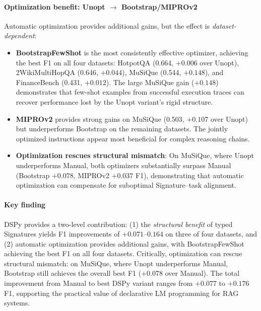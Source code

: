 \paragraph{Optimization benefit: Unopt $\to$ Bootstrap/MIPROv2}
Automatic optimization provides additional gains, but the effect is \emph{dataset-dependent}:

\begin{itemize}
    \item \textbf{BootstrapFewShot} is the most consistently effective optimizer, achieving the best F1 on all four datasets: HotpotQA (0.664, $+0.006$ over Unopt), 2WikiMultiHopQA (0.646, $+0.044$), MuSiQue (0.544, $+0.148$), and FinanceBench (0.431, $+0.012$). The large MuSiQue gain ($+0.148$) demonstrates that few-shot examples from successful execution traces can recover performance lost by the Unopt variant's rigid structure.

    \item \textbf{MIPROv2} provides strong gains on MuSiQue (0.503, $+0.107$ over Unopt) but underperforms Bootstrap on the remaining datasets. The jointly optimized instructions appear most beneficial for complex reasoning chains.

    \item \textbf{Optimization rescues structural mismatch}: On MuSiQue, where Unopt underperforms Manual, both optimizers substantially surpass Manual (Bootstrap $+0.078$, MIPROv2 $+0.037$ F1), demonstrating that automatic optimization can compensate for suboptimal Signature--task alignment.
\end{itemize}

\paragraph{Key finding}
DSPy provides a two-level contribution: (1) the \emph{structural benefit} of typed Signatures yields F1 improvements of $+0.071$--$0.164$ on three of four datasets, and (2) automatic optimization provides additional gains, with BootstrapFewShot achieving the best F1 on all four datasets.
Critically, optimization can rescue structural mismatch: on MuSiQue, where Unopt underperforms Manual, Bootstrap still achieves the overall best F1 ($+0.078$ over Manual).
The total improvement from Manual to best DSPy variant ranges from $+0.077$ to $+0.176$ F1, supporting the practical value of declarative LM programming for RAG systems.
